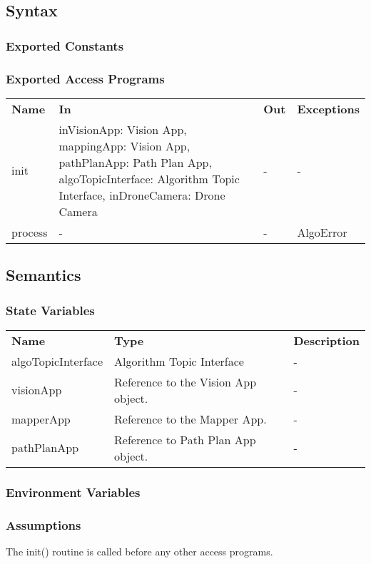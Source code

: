\documentclass[12pt, titlepage]{article}
\begin{document}
\subsection{Syntax}
\subsubsection{Exported Constants}
\subsubsection{Exported Access Programs}
\begin{center}
\begin{tabular}{p{3.5cm} p{2.5cm} p{2.5cm} p{5cm}}
\hline
\textbf{Name} & \textbf{In} & \textbf{Out} & \textbf{Exceptions} \\
init & inVisionApp: Vision App, mappingApp: Vision App, pathPlanApp: Path Plan App, algoTopicInterface: Algorithm Topic Interface, inDroneCamera: Drone Camera  & - & - \\
process & -  & - & AlgoError \\
\hline
\hline
\end{tabular}
\end{center}
\subsection{Semantics}
\subsubsection{State Variables}
\begin{center}
\begin{tabular}{p{3 cm} p{4cm} p{5cm} }
\hline
\textbf{Name} & \textbf{Type} & \textbf{Description}  \\
algoTopicInterface & Algorithm Topic Interface & - \\
visionApp & Reference to the Vision App object. & - \\
mapperApp & Reference to the Mapper App. & - \\
pathPlanApp & Reference to Path Plan App object. & - \\
\hline
\hline
\end{tabular}
\end{center}
\subsubsection{Environment Variables}
\subsubsection{Assumptions}
The init() routine is called before any other access programs.
\end{document}
